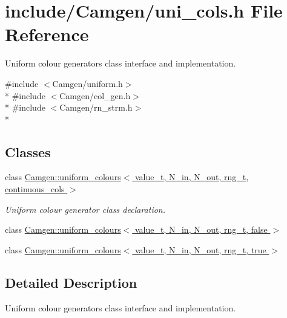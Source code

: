 \hypertarget{a00794}{\section{include/\-Camgen/uni\-\_\-cols.h File Reference}
\label{a00794}
}


Uniform colour generators class interface and implementation.  


{\ttfamily \#include $<$Camgen/uniform.\-h$>$}\\*
{\ttfamily \#include $<$Camgen/col\-\_\-gen.\-h$>$}\\*
{\ttfamily \#include $<$Camgen/rn\-\_\-strm.\-h$>$}\\*
\subsection*{Classes}
\begin{DoxyCompactItemize}
\item 
class \hyperlink{a00543}{Camgen\-::uniform\-\_\-colours$<$ value\-\_\-t, N\-\_\-in, N\-\_\-out, rng\-\_\-t, continuous\-\_\-cols $>$}
\begin{DoxyCompactList}\small\item\em Uniform colour generator class declaration. \end{DoxyCompactList}\item 
class \hyperlink{a00544}{Camgen\-::uniform\-\_\-colours$<$ value\-\_\-t, N\-\_\-in, N\-\_\-out, rng\-\_\-t, false $>$}
\item 
class \hyperlink{a00545}{Camgen\-::uniform\-\_\-colours$<$ value\-\_\-t, N\-\_\-in, N\-\_\-out, rng\-\_\-t, true $>$}
\end{DoxyCompactItemize}


\subsection{Detailed Description}
Uniform colour generators class interface and implementation. 